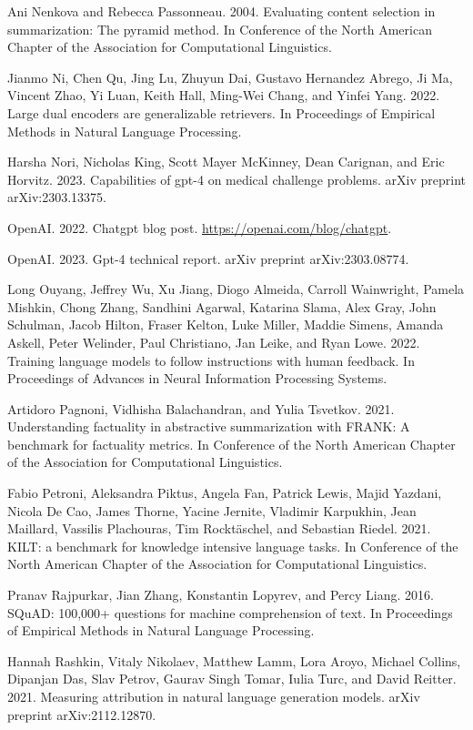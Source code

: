 \documentclass[11pt,UTF8,fontset=fandol]{ctexart}
\begin{document}
Ani Nenkova and Rebecca Passonneau. 2004. Evaluating content selection in summarization: The pyramid method. In Conference of the North American Chapter of the Association for Computational Linguistics.

Jianmo Ni, Chen Qu, Jing Lu, Zhuyun Dai, Gustavo Hernandez Abrego, Ji Ma, Vincent Zhao, Yi Luan, Keith Hall, Ming-Wei Chang, and Yinfei Yang. 2022. Large dual encoders are generalizable retrievers. In Proceedings of Empirical Methods in Natural Language Processing.

Harsha Nori, Nicholas King, Scott Mayer McKinney, Dean Carignan, and Eric Horvitz. 2023. Capabilities of gpt-4 on medical challenge problems. arXiv preprint arXiv:2303.13375.

OpenAI. 2022. Chatgpt blog post. \url{https://openai.com/blog/chatgpt}.

OpenAI. 2023. Gpt-4 technical report. arXiv preprint arXiv:2303.08774.

Long Ouyang, Jeffrey Wu, Xu Jiang, Diogo Almeida, Carroll Wainwright, Pamela Mishkin, Chong Zhang, Sandhini Agarwal, Katarina Slama, Alex Gray, John Schulman, Jacob Hilton, Fraser Kelton, Luke Miller, Maddie Simens, Amanda Askell, Peter Welinder, Paul Christiano, Jan Leike, and Ryan Lowe. 2022. Training language models to follow instructions with human feedback. In Proceedings of Advances in Neural Information Processing Systems.

Artidoro Pagnoni, Vidhisha Balachandran, and Yulia Tsvetkov. 2021. Understanding factuality in abstractive summarization with FRANK: A benchmark for factuality metrics. In Conference of the North American Chapter of the Association for Computational Linguistics.

Fabio Petroni, Aleksandra Piktus, Angela Fan, Patrick Lewis, Majid Yazdani, Nicola De Cao, James Thorne, Yacine Jernite, Vladimir Karpukhin, Jean Maillard, Vassilis Plachouras, Tim Rocktäschel, and Sebastian Riedel. 2021. KILT: a benchmark for knowledge intensive language tasks. In Conference of the North American Chapter of the Association for Computational Linguistics.

Pranav Rajpurkar, Jian Zhang, Konstantin Lopyrev, and Percy Liang. 2016. SQuAD: 100,000+ questions for machine comprehension of text. In Proceedings of Empirical Methods in Natural Language Processing.

Hannah Rashkin, Vitaly Nikolaev, Matthew Lamm, Lora Aroyo, Michael Collins, Dipanjan Das, Slav Petrov, Gaurav Singh Tomar, Iulia Turc, and David Reitter. 2021. Measuring attribution in natural language generation models. arXiv preprint arXiv:2112.12870.
\end{document}
